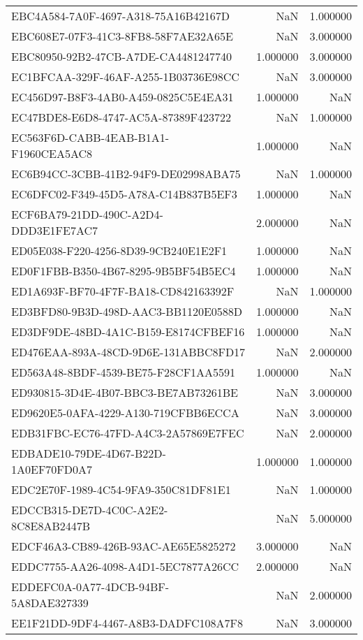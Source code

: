 \begin{tabular}{lrr}
EBC4A584-7A0F-4697-A318-75A16B42167D & NaN & 1.000000 \\
EBC608E7-07F3-41C3-8FB8-58F7AE32A65E & NaN & 3.000000 \\
EBC80950-92B2-47CB-A7DE-CA4481247740 & 1.000000 & 3.000000 \\
EC1BFCAA-329F-46AF-A255-1B03736E98CC & NaN & 3.000000 \\
EC456D97-B8F3-4AB0-A459-0825C5E4EA31 & 1.000000 & NaN \\
EC47BDE8-E6D8-4747-AC5A-87389F423722 & NaN & 1.000000 \\
EC563F6D-CABB-4EAB-B1A1-F1960CEA5AC8 & 1.000000 & NaN \\
EC6B94CC-3CBB-41B2-94F9-DE02998ABA75 & NaN & 1.000000 \\
EC6DFC02-F349-45D5-A78A-C14B837B5EF3 & 1.000000 & NaN \\
ECF6BA79-21DD-490C-A2D4-DDD3E1FE7AC7 & 2.000000 & NaN \\
ED05E038-F220-4256-8D39-9CB240E1E2F1 & 1.000000 & NaN \\
ED0F1FBB-B350-4B67-8295-9B5BF54B5EC4 & 1.000000 & NaN \\
ED1A693F-BF70-4F7F-BA18-CD842163392F & NaN & 1.000000 \\
ED3BFD80-9B3D-498D-AAC3-BB1120E0588D & 1.000000 & NaN \\
ED3DF9DE-48BD-4A1C-B159-E8174CFBEF16 & 1.000000 & NaN \\
ED476EAA-893A-48CD-9D6E-131ABBC8FD17 & NaN & 2.000000 \\
ED563A48-8BDF-4539-BE75-F28CF1AA5591 & 1.000000 & NaN \\
ED930815-3D4E-4B07-BBC3-BE7AB73261BE & NaN & 3.000000 \\
ED9620E5-0AFA-4229-A130-719CFBB6ECCA & NaN & 3.000000 \\
EDB31FBC-EC76-47FD-A4C3-2A57869E7FEC & NaN & 2.000000 \\
EDBADE10-79DE-4D67-B22D-1A0EF70FD0A7 & 1.000000 & 1.000000 \\
EDC2E70F-1989-4C54-9FA9-350C81DF81E1 & NaN & 1.000000 \\
EDCCB315-DE7D-4C0C-A2E2-8C8E8AB2447B & NaN & 5.000000 \\
EDCF46A3-CB89-426B-93AC-AE65E5825272 & 3.000000 & NaN \\
EDDC7755-AA26-4098-A4D1-5EC7877A26CC & 2.000000 & NaN \\
EDDEFC0A-0A77-4DCB-94BF-5A8DAE327339 & NaN & 2.000000 \\
EE1F21DD-9DF4-4467-A8B3-DADFC108A7F8 & NaN & 3.000000 \\

\end{tabular}
